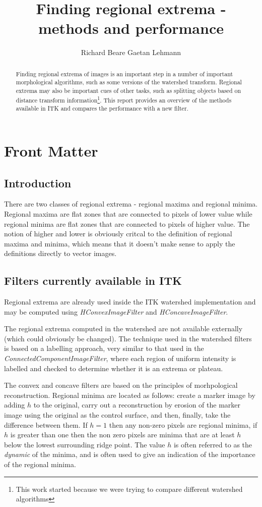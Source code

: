 \documentclass{InsightArticle}
\title{Finding regional extrema - methods and performance}
\author{Richard Beare Gaetan Lehmann}
\begin{document}
\maketitle

\ifhtml
\chapter*{Front Matter\label{front}}
\fi

\begin{abstract}
\noindent
Finding regional extrema of images is an important step in a number of
important morphological algorithms, such as some versions of the
watershed transform. Regional extrema may also be important cues of
other tasks, such as splitting objects based on distance transform
information\footnote{This work started because we were trying to
compare different watershed algorithms}. This report provides an
overview of the methods available in ITK and compares the performance
with a new filter.
\end{abstract}

\section{Introduction}
There are two classes of regional extrema - regional maxima and
regional minima. Regional maxima are flat zones that are connected to
pixels of lower value while regional minima are flat zones that are
connected to pixels of higher value. The notion of higher and lower is
obviously critcal to the definition of regional maxima and minima,
which means that it doesn't make sense to apply the definitions
directly to vector images.

\section{Filters currently available in ITK}
Regional extrema are already used inside the ITK watershed
implementation and may be computed using {\em HConvexImageFilter}
and {\em HConcaveImageFilter}. 

The regional extrema computed in the watershed are not available
externally (which could obviously be changed). The technique used in
the watershed filters is based on a labelling approach, very similar
to that used in the {\em ConnectedComponentImageFilter}, where each
region of uniform intensity is labelled and checked to determine
whether it is an extrema or plateau.

The convex and concave filters are based on the principles of
morhpological reconstruction. Regional minima are located as follows:
create a marker image by adding $h$ to the original, carry out a
reconstruction by erosion of the marker image using the original as
the control surface, and then, finally, take the difference between
them. If $h=1$ then any non-zero pixels are regional minima, if $h$ is
greater than one then the non zero pixels are minima that are at least
$h$ below the lowest surrounding ridge point. The value $h$ is often
referred to as the {\em dynamic} of the minima, and is often used to
give an indication of the importance of the regional minima.
\end{document}
